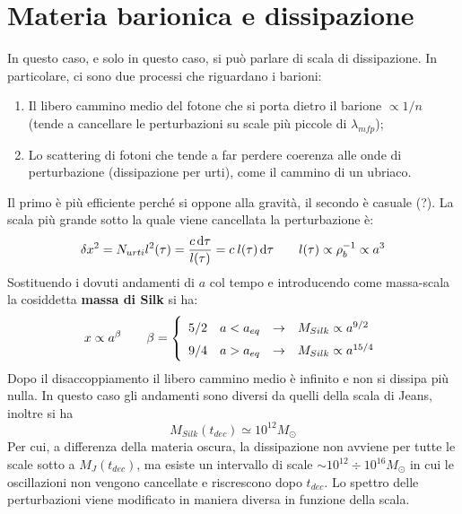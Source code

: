 \section{Materia barionica e dissipazione}
In questo caso, e solo in questo caso, si può parlare di scala di dissipazione. In particolare, ci sono due processi che riguardano i barioni: 
\begin{enumerate}
    \item Il libero cammino medio del fotone che si porta dietro il barione $\propto 1/n$ (tende a cancellare le perturbazioni su scale più piccole di $\lambda_{mfp}$);
    \item Lo scattering di fotoni che tende a far perdere coerenza alle onde di perturbazione (dissipazione per urti), come il cammino di un ubriaco.
\end{enumerate}
Il primo è più efficiente perché si oppone alla gravità, il secondo è casuale (?). La scala più grande sotto la quale viene cancellata la perturbazione è:
\begin{equation*}
    \delta x^2 = N_{urti}l^2(\tau) = \frac{c \operatorname{d}\!{\tau}}{l(\tau)} = c\: l(\tau)\operatorname{d}\!{\tau} \qquad l(\tau)\propto \rho_b^{-1}\propto a^{3}
\end{equation*}
Sostituendo i dovuti andamenti di $a$ col tempo e introducendo come massa-scala la cosiddetta \textbf{massa di Silk} si ha:
\begin{equation}x \propto a^\beta \qquad \beta=\left\{
    \def\arraystretch{1.5}
        \begin{array}{llll}
        5/2 & a<a_{eq} & \rightarrow & M_{Silk}\propto a^{9/2} \\
        9/4 & a>a_{eq} & \rightarrow & M_{Silk}\propto a^{15/4}
    \end{array}\right.
\end{equation}
Dopo il disaccoppiamento il libero cammino medio è infinito e non si dissipa più nulla. In questo caso gli andamenti sono diversi da quelli della scala di Jeans, inoltre si ha 
\begin{equation}
    M_{Silk}(t_{dec})\simeq 10^{12}M_\odot
\end{equation}
Per cui, a differenza della materia oscura, la dissipazione non avviene per tutte le scale sotto a $M_J(t_{dec})$, ma esiste un intervallo di scale $\sim 10^{12}\div 10^{16}M_\odot$ in cui le oscillazioni non vengono cancellate e riscrescono dopo $t_{dec}$. Lo spettro delle perturbazioni viene modificato in maniera diversa in funzione della scala. 
